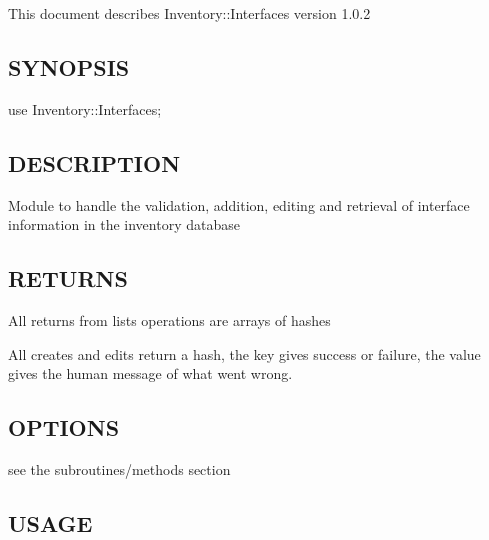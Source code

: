 \documentclass{book}
\begin{document}
This document describes Inventory::Interfaces version 1.0.2


\subsection{SYNOPSIS}
\label{Inventory::Interfaces_SYNOPSIS}
\hypertarget{Inventory::Interfaces_SYNOPSIS}{}



use Inventory::Interfaces;


\subsection{DESCRIPTION}
\label{Inventory::Interfaces_DESCRIPTION}
\hypertarget{Inventory::Interfaces_DESCRIPTION}{}



Module to handle the validation, addition, editing and retrieval of interface information in the inventory database


\subsection{RETURNS}
\label{Inventory::Interfaces_RETURNS}
\hypertarget{Inventory::Interfaces_RETURNS}{}



All returns from lists operations are arrays of hashes



All creates and edits return a hash, the key gives success or failure, the value gives the human message of what went wrong.


\subsection{OPTIONS}
\label{Inventory::Interfaces_OPTIONS}
\hypertarget{Inventory::Interfaces_OPTIONS}{}



see the subroutines/methods section


\subsection{USAGE}
\label{Inventory::Interfaces_USAGE}
\hypertarget{Inventory::Interfaces_USAGE}{}
\end{document}

